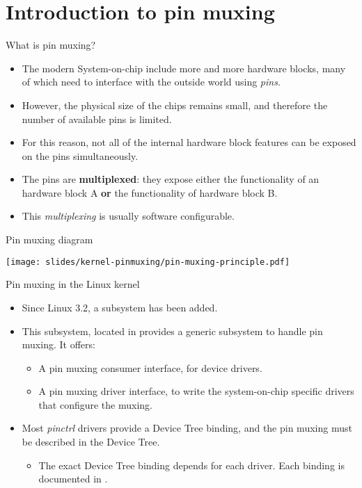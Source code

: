 \section{Introduction to pin muxing}

\begin{frame}{What is pin muxing?}
  \begin{itemize}
  \item The modern System-on-chip include more and more hardware
    blocks, many of which need to interface with the outside world
    using {\em pins}.
  \item However, the physical size of the chips remains small, and
    therefore the number of available pins is limited.
  \item For this reason, not all of the internal hardware block
    features can be exposed on the pins simultaneously.
  \item The pins are {\bf multiplexed}: they expose either the
    functionality of an hardware block A {\bf or} the functionality of
    hardware block B.
  \item This {\em multiplexing} is usually software configurable.
  \end{itemize}
\end{frame}

\begin{frame}{Pin muxing diagram}
  \begin{center}
    \texttt{[image: slides/kernel-pinmuxing/pin-muxing-principle.pdf]}
  \end{center}
\end{frame}

\begin{frame}{Pin muxing in the Linux kernel}
  \begin{itemize}
  \item Since Linux 3.2, a  subsystem has been added.
  \item This subsystem, located in  provides a
    generic subsystem to handle pin muxing. It offers:
    \begin{itemize}
    \item A pin muxing consumer interface, for device drivers.
    \item A pin muxing driver interface, to write the system-on-chip
      specific drivers that configure the muxing.
    \end{itemize}
  \item Most {\em pinctrl} drivers provide a Device Tree binding, and
    the pin muxing must be described in the Device Tree.
    \begin{itemize}
    \item The exact Device Tree binding depends for each driver. Each
      binding is documented in
      .
    \end{itemize}
  \end{itemize}
\end{frame}

